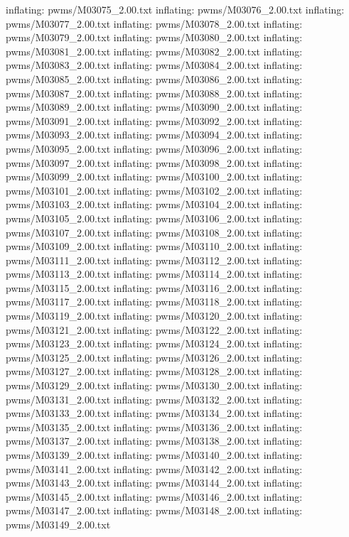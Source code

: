 \documentclass[letterpaper,10pt,english]{sphinxmanual}
\begin{document}
{\begin{sphinxVerbatim}[commandchars=\\\{\}]
  inflating: pwms/M03075\_2.00.txt
  inflating: pwms/M03076\_2.00.txt
  inflating: pwms/M03077\_2.00.txt
  inflating: pwms/M03078\_2.00.txt
  inflating: pwms/M03079\_2.00.txt
  inflating: pwms/M03080\_2.00.txt
  inflating: pwms/M03081\_2.00.txt
  inflating: pwms/M03082\_2.00.txt
  inflating: pwms/M03083\_2.00.txt
  inflating: pwms/M03084\_2.00.txt
  inflating: pwms/M03085\_2.00.txt
  inflating: pwms/M03086\_2.00.txt
  inflating: pwms/M03087\_2.00.txt
  inflating: pwms/M03088\_2.00.txt
  inflating: pwms/M03089\_2.00.txt
  inflating: pwms/M03090\_2.00.txt
  inflating: pwms/M03091\_2.00.txt
  inflating: pwms/M03092\_2.00.txt
  inflating: pwms/M03093\_2.00.txt
  inflating: pwms/M03094\_2.00.txt
  inflating: pwms/M03095\_2.00.txt
  inflating: pwms/M03096\_2.00.txt
  inflating: pwms/M03097\_2.00.txt
  inflating: pwms/M03098\_2.00.txt
  inflating: pwms/M03099\_2.00.txt
  inflating: pwms/M03100\_2.00.txt
  inflating: pwms/M03101\_2.00.txt
  inflating: pwms/M03102\_2.00.txt
  inflating: pwms/M03103\_2.00.txt
  inflating: pwms/M03104\_2.00.txt
  inflating: pwms/M03105\_2.00.txt
  inflating: pwms/M03106\_2.00.txt
  inflating: pwms/M03107\_2.00.txt
  inflating: pwms/M03108\_2.00.txt
  inflating: pwms/M03109\_2.00.txt
  inflating: pwms/M03110\_2.00.txt
  inflating: pwms/M03111\_2.00.txt
  inflating: pwms/M03112\_2.00.txt
  inflating: pwms/M03113\_2.00.txt
  inflating: pwms/M03114\_2.00.txt
  inflating: pwms/M03115\_2.00.txt
  inflating: pwms/M03116\_2.00.txt
  inflating: pwms/M03117\_2.00.txt
  inflating: pwms/M03118\_2.00.txt
  inflating: pwms/M03119\_2.00.txt
  inflating: pwms/M03120\_2.00.txt
  inflating: pwms/M03121\_2.00.txt
  inflating: pwms/M03122\_2.00.txt
  inflating: pwms/M03123\_2.00.txt
  inflating: pwms/M03124\_2.00.txt
  inflating: pwms/M03125\_2.00.txt
  inflating: pwms/M03126\_2.00.txt
  inflating: pwms/M03127\_2.00.txt
  inflating: pwms/M03128\_2.00.txt
  inflating: pwms/M03129\_2.00.txt
  inflating: pwms/M03130\_2.00.txt
  inflating: pwms/M03131\_2.00.txt
  inflating: pwms/M03132\_2.00.txt
  inflating: pwms/M03133\_2.00.txt
  inflating: pwms/M03134\_2.00.txt
  inflating: pwms/M03135\_2.00.txt
  inflating: pwms/M03136\_2.00.txt
  inflating: pwms/M03137\_2.00.txt
  inflating: pwms/M03138\_2.00.txt
  inflating: pwms/M03139\_2.00.txt
  inflating: pwms/M03140\_2.00.txt
  inflating: pwms/M03141\_2.00.txt
  inflating: pwms/M03142\_2.00.txt
  inflating: pwms/M03143\_2.00.txt
  inflating: pwms/M03144\_2.00.txt
  inflating: pwms/M03145\_2.00.txt
  inflating: pwms/M03146\_2.00.txt
  inflating: pwms/M03147\_2.00.txt
  inflating: pwms/M03148\_2.00.txt
  inflating: pwms/M03149\_2.00.txt

\end{sphinxVerbatim}}
\end{document}
